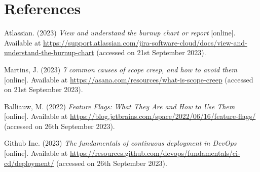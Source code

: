 \section{References}

\noindent [TODO1] Atlassian. (2023) \textit{View and understand the burnup chart or report} [online]. Available at \url{https://support.atlassian.com/jira-software-cloud/docs/view-and-understand-the-burnup-chart} (accessed on 21st September 2023).
\vspace{0.2cm}

\noindent [TODO2] Martins, J. (2023) \textit{7 common causes of scope creep, and how to avoid them} [online]. Available at \url{https://asana.com/resources/what-is-scope-creep} (accessed on 21st September 2023).
\vspace{0.2cm}

\noindent [TODO3] Balliauw, M. (2022) \textit{Feature Flags: What They Are and How to Use Them} [online]. Available at \url{https://blog.jetbrains.com/space/2022/06/16/feature-flags/} (accessed on 26th September 2023).
\vspace{0.2cm}

\noindent [TODO4] Github Inc. (2023) \textit{The fundamentals of continuous deployment in DevOps} [online]. Available at \url{https://resources.github.com/devops/fundamentals/ci-cd/deployment/} (accessed on 26th September 2023).
\vspace{0.2cm}

\newpage